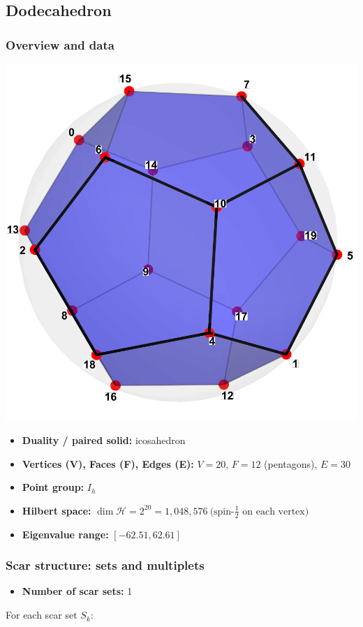 \documentclass[11pt,a4paper]{article}
\begin{document}
\subsection*{Dodecahedron}

\subsubsection*{Overview and data}
\begin{center}
  \includegraphics[width=.6\linewidth]{dodecahedron}
\end{center}

\begin{itemize}[leftmargin=1.5em]
  \item \textbf{Duality / paired solid:} icosahedron
  \item \textbf{Vertices (V), Faces (F), Edges (E):} $V = 20$,\; $F = 12$ (pentagons),\; $E = 30$
  \item \textbf{Point group:} $I_h$
  \item \textbf{Hilbert space:} \(
        \dim\mathcal{H} = 2^{20} = 1,048,576\ \text{(spin-$\tfrac12$ on each vertex)}
        \)
  \item \textbf{Eigenvalue range:} $[-62.51, 62.61]$
\end{itemize}

\subsubsection*{Scar structure: sets and multiplets}

\begin{itemize}[leftmargin=1.5em]
  \item \textbf{Number of scar sets:} 1
  \end{itemize}
  \hspace{6mm}For each scar set $S_k$:\\
\end{document}
